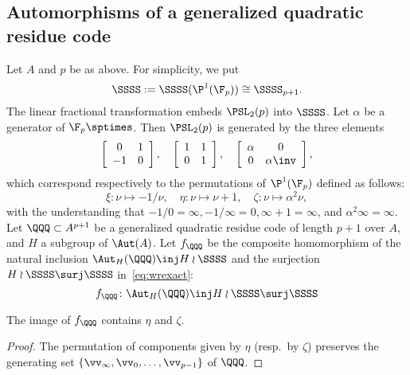 \documentclass{amsart}
\begin{document}
\subsection{Automorphisms of a generalized quadratic residue code}\label{subsec:autGQRC}
%
%
Let $A$ and $p$ be as above.
For simplicity, we put  
$$
\SSSS:=\SSSS(\P^1(\F_p))\cong \SSSS_{p+1}.
$$
The linear fractional transformation embeds $\PSL_2 (p)$
into $\SSSS$.
Let $\alpha$ be a generator of $\F_p\sptimes$.
Then $\PSL_2(p)$ is generated by the three elements
$$ 
\left[\begin{array}{cc} 0 & 1 \\ -1 & 0\end{array}\right],
\quad
\left[\begin{array}{cc} 1 & 1 \\ 0 & 1\end{array}\right],
\quad
\left[\begin{array}{cc} \alpha& 0 \\  0& \alpha\inv\end{array}\right],
$$
which correspond respectively  to the permutations of $\P^1(\F_p)$ defined as follows:
$$
\xi \colon \nu\mapsto -1/\nu, 
\quad
\eta \colon  \nu\mapsto \nu+1,
\quad
\zeta \colon \nu\mapsto \alpha^2 \nu,
$$
with the understanding that $-1/0=\infty, -1/\infty=0, \infty+1=\infty$, and $\alpha^2\infty=\infty$.
%
Let $\QQQ\subset A^{p+1}$  be a generalized quadratic residue code of length $p+1$ over $A$,
and $H$ a subgroup of $\Aut(A)$.
Let $f_{\QQQ}$ be the composite homomorphism
of  the natural inclusion $\Aut_{H}(\QQQ) \inj H\wr \SSSS$ 
and the surjection $H\wr \SSSS\surj \SSSS$ in~\eqref{eq:wrexact}:
$$
f_{\QQQ} \colon \Aut_{H}(\QQQ) \inj H\wr \SSSS\surj \SSSS
$$
%
\begin{lemma}\label{lem:etazeta}
The image of $f_{\QQQ}$ contains $\eta$ and $\zeta$.
\end{lemma}
%
\begin{proof}
The permutation of components given by $\eta$ (resp.~by $\zeta$)
preserves the generating set $\{\vv_{\infty}, \vv_{0}, \dots, \vv_{p-1}\}$ of $\QQQ$.
\end{proof}
%
%
\end{document}
